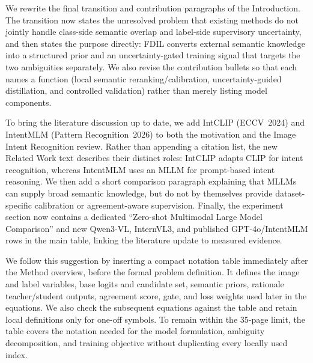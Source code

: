 {We rewrite the final transition and contribution paragraphs of the Introduction. The transition now states the unresolved problem that existing methods do not jointly handle class-side semantic overlap and label-side supervisory uncertainty, and then states the purpose directly: FDIL converts external semantic knowledge into a structured prior and an uncertainty-gated training signal that targets the two ambiguities separately. We also revise the contribution bullets so that each names a function (local semantic reranking/calibration, uncertainty-guided distillation, and controlled validation) rather than merely listing model components.
}

{To bring the literature discussion up to date, we add IntCLIP (ECCV~2024) and IntentMLM (Pattern Recognition~2026) to both the motivation and the Image Intent Recognition review. Rather than appending a citation list, the new Related Work text describes their distinct roles: IntCLIP adapts CLIP for intent recognition, whereas IntentMLM uses an MLLM for prompt-based intent reasoning. We then add a short comparison paragraph explaining that MLLMs can supply broad semantic knowledge, but do not by themselves provide dataset-specific calibration or agreement-aware supervision. Finally, the experiment section now contains a dedicated ``Zero-shot Multimodal Large Model Comparison'' and new Qwen3-VL, InternVL3, and published GPT-4o/IntentMLM rows in the main table, linking the literature update to measured evidence.
}
\showMainResults

{We follow this suggestion by inserting a compact notation table immediately after the Method overview, before the formal problem definition. It defines the image and label variables, base logits and candidate set, semantic priors, rationale teacher/student outputs, agreement score, gate, and loss weights used later in the equations. We also check the subsequent equations against the table and retain local definitions only for one-off symbols. To remain within the 35-page limit, the table covers the notation needed for the model formulation, ambiguity decomposition, and training objective without duplicating every locally used index.
}
\showNotation

